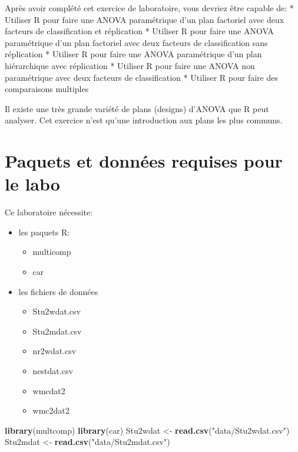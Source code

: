 \documentclass[12pt,]{book}
\newenvironment{Shaded}{\begin{snugshade}}{\end{snugshade}}
\newcommand{\KeywordTok}[1]{\textcolor[rgb]{0.27,0.27,0.27}{\textbf{#1}}}
\newcommand{\NormalTok}[1]{#1}
\newcommand{\StringTok}[1]{\textcolor[rgb]{0.5,0.5,0.5}{#1}}
\providecommand{\tightlist}{%
  \setlength{\itemsep}{0pt}\setlength{\parskip}{0pt}}
\begin{document}
Après avoir complété cet exercice de laboratoire, vous devriez être
capable de:
* Utiliser R pour faire une ANOVA paramétrique d'un plan factoriel avec deux facteurs de classification et réplication
* Utiliser R pour faire une ANOVA paramétrique d'un plan factoriel avec deux facteurs de classification sans réplication
* Utiliser R pour faire une ANOVA paramétrique d'un plan hiérarchique avec réplication
* Utiliser R pour faire une ANOVA non paramétrique avec deux facteurs de classification
* Utiliser R pour faire des comparaisons multiples

Il existe une très grande variété de plans (designs) d'ANOVA que R peut analyser. Cet exercice n'est qu'une introduction aux plans les plus communs.

\hypertarget{set-anomul}{%
\section{Paquets et données requises pour le labo}\label{set-anomul}}

Ce laboratoire nécessite:

\begin{itemize}
\tightlist
\item
  les paquets R:

  \begin{itemize}
  \tightlist
  \item
    multicomp
  \item
    car
  \end{itemize}
\item
  les fichiers de données

  \begin{itemize}
  \tightlist
  \item
    Stu2wdat.csv
  \item
    Stu2mdat.csv
  \item
    nr2wdat.csv
  \item
    nestdat.csv
  \item
    wmcdat2
  \item
    wmc2dat2
  \end{itemize}
\end{itemize}

\begin{Shaded}
\begin{Highlighting}[]
\KeywordTok{library}\NormalTok{(multcomp)}
\KeywordTok{library}\NormalTok{(car)}
\NormalTok{Stu2wdat <-}\StringTok{ }\KeywordTok{read.csv}\NormalTok{(}\StringTok{"data/Stu2wdat.csv"}\NormalTok{)}
\NormalTok{Stu2mdat <-}\StringTok{ }\KeywordTok{read.csv}\NormalTok{(}\StringTok{"data/Stu2mdat.csv"}\NormalTok{)}
\end{Highlighting}
\end{Shaded}
\end{document}

